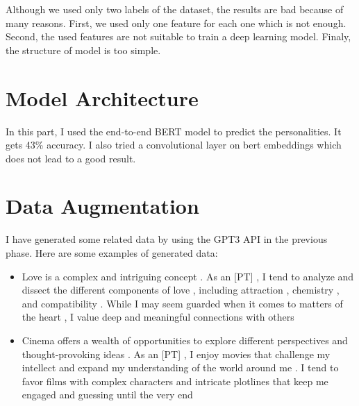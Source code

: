 \begin{figure}[H]
    \centering
\end{figure}


Although we used only two labels of the dataset, the results are bad because of many reasons. First, we used only one feature for each one which is not enough. Second, the used features are not suitable to train a deep learning model. Finaly, the structure of model is too simple.

\section{Model Architecture}
In this part, I used the end-to-end BERT model to predict the personalities. It gets 43\% accuracy. I also tried a convolutional layer on bert embeddings which does not lead to a good result.


\section{Data Augmentation}
I have generated some related data by using the GPT3 API in the previous phase. Here are some examples of generated data:


\begin{itemize}
    \item Love is a complex and intriguing concept . As an [PT] , I tend to analyze and dissect the different components of love , including attraction , chemistry , and compatibility . While I may seem guarded when it comes to matters of the heart , I value deep and meaningful connections with others
    \item Cinema offers a wealth of opportunities to explore different perspectives and thought-provoking ideas . As an [PT] , I enjoy movies that challenge my intellect and expand my understanding of the world around me . I tend to favor films with complex characters and intricate plotlines that keep me engaged and guessing until the very end
\end{itemize}


